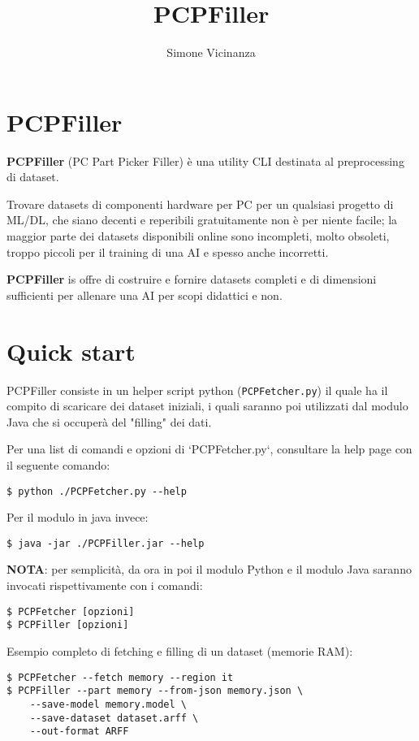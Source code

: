\documentclass[12pt]{report}
\title{PCPFiller}
\author{Simone Vicinanza}
\date{}
\begin{document}
\maketitle
\tableofcontents

\newpage
\section{PCPFiller}

\textbf{PCPFiller} (PC Part Picker Filler) è una utility CLI destinata al
preprocessing di dataset.

Trovare datasets di componenti hardware per PC per un qualsiasi progetto di ML/DL, che siano
decenti e reperibili gratuitamente non è per niente facile; la maggior parte dei datasets
disponibili online sono incompleti, molto obsoleti, troppo piccoli per il training di una AI e
spesso anche incorretti.

\textbf{PCPFiller} is offre di costruire e fornire datasets completi e di dimensioni sufficienti per allenare
una AI per scopi didattici e non.

\section{Quick start}

PCPFiller consiste in un helper script python (\texttt{PCPFetcher.py}) il quale ha il compito di
scaricare dei dataset iniziali, i quali saranno poi utilizzati dal modulo Java che si occuperà del
"filling" dei dati.

Per una list di comandi e opzioni di `PCPFetcher.py`, consultare la help page con il seguente comando:
\begin{lstlisting}
$ python ./PCPFetcher.py --help
\end{lstlisting}

Per il modulo in java invece:
\begin{lstlisting}
$ java -jar ./PCPFiller.jar --help
\end{lstlisting}

\textbf{NOTA}: per semplicità, da ora in poi il modulo Python e il modulo Java saranno invocati
rispettivamente con i comandi:
\begin{lstlisting}
$ PCPFetcher [opzioni]
$ PCPFiller [opzioni]
\end{lstlisting}

Esempio completo di fetching e filling di un dataset (memorie RAM):
\begin{lstlisting}
$ PCPFetcher --fetch memory --region it
$ PCPFiller --part memory --from-json memory.json \
	--save-model memory.model \
	--save-dataset dataset.arff \
	--out-format ARFF
\end{lstlisting}
\end{document}
